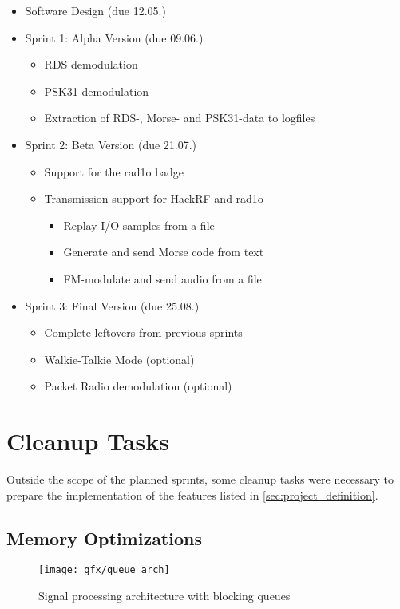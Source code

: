 \begin{itemize}
	\item Software Design (due 12.05.)
	\item Sprint 1: Alpha Version (due 09.06.)
	\begin{itemize}
		\item \ac{RDS} demodulation
		\item \ac{PSK31} demodulation
		\item Extraction of \ac{RDS}-, Morse- and \ac{PSK31}-data to logfiles
	\end{itemize}
	\item Sprint 2: Beta Version (due 21.07.)
	\begin{itemize}
		\item Support for the rad1o badge
		\item Transmission support for HackRF and rad1o
		\begin{itemize}
			\item Replay I/O samples from a file
			\item Generate and send Morse code from text
			\item FM-modulate and send audio from a file
		\end{itemize}
	\end{itemize}
	\item Sprint 3: Final Version (due 25.08.)
	\begin{itemize}
		\item Complete leftovers from previous sprints
		\item Walkie-Talkie Mode (optional)
		\item Packet Radio demodulation (optional)
	\end{itemize}
\end{itemize}

\section{Cleanup Tasks\label{sec:cleanup}}

Outside the scope of the planned sprints, some cleanup tasks were necessary
to prepare the implementation of the features listed in
\autoref{sec:project_definition}.

\subsection{Memory Optimizations\label{sec:cleanup.mem}}

\begin{figure}
	\centering
	\texttt{[image: gfx/queue\_arch]}
	\caption{Signal processing architecture with blocking queues}
	\label{fig:queue_architecture}
\end{figure}

